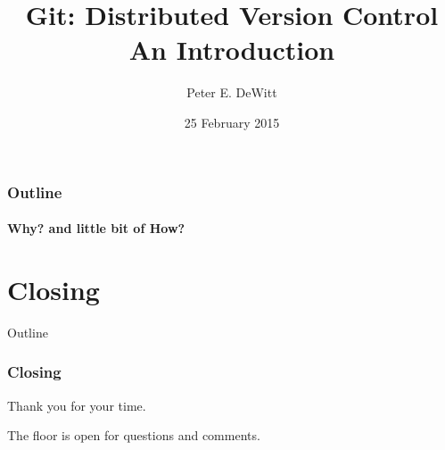 \ifuseblack
\else
\fi


\author{Peter E. DeWitt}
\title[Intro to Git]{Git: Distributed Version Control \\ {\small An
Introduction}}
\date{25 February 2015}



 
  \watermarkoff

  \begin{frame}[t,plain]
    \titlepage
  \end{frame}

  \begin{frame}[t]
    \frametitle{Outline}
    \framesubtitle{Why? and little bit of How?}
    \tableofcontents[hideallsubsections] 
  \end{frame}

   
  
  
  


  \section{Closing}
  \begin{frame}[t]{Outline}
  \end{frame}

  \begin{frame}[t] 
    \frametitle{Closing}
    \begin{center}
    Thank you for your time.

    \vspace{1in}

    The floor is open for questions and comments.
    \end{center} 
  \end{frame}



